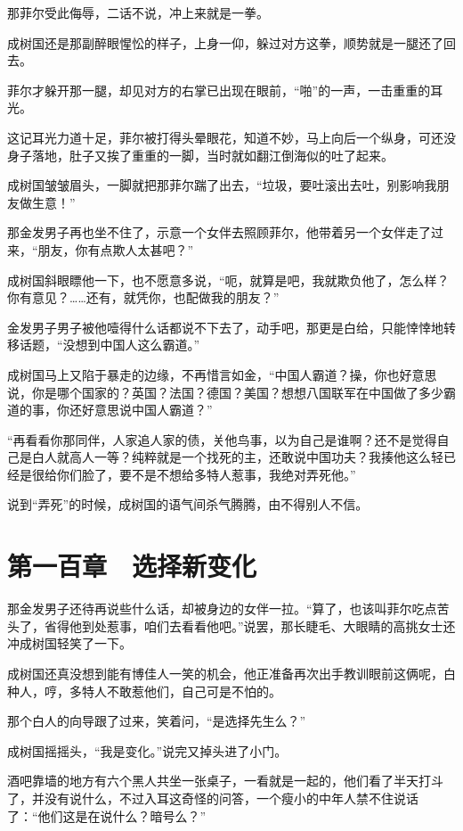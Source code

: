 那菲尔受此侮辱，二话不说，冲上来就是一拳。

成树国还是那副醉眼惺忪的样子，上身一仰，躲过对方这拳，顺势就是一腿还了回去。

菲尔才躲开那一腿，却见对方的右掌已出现在眼前，“啪”的一声，一击重重的耳光。

这记耳光力道十足，菲尔被打得头晕眼花，知道不妙，马上向后一个纵身，可还没身子落地，肚子又挨了重重的一脚，当时就如翻江倒海似的吐了起来。

成树国皱皱眉头，一脚就把那菲尔踹了出去，“垃圾，要吐滚出去吐，别影响我朋友做生意！”

那金发男子再也坐不住了，示意一个女伴去照顾菲尔，他带着另一个女伴走了过来，“朋友，你有点欺人太甚吧？”

成树国斜眼瞟他一下，也不愿意多说，“呃，就算是吧，我就欺负他了，怎么样？你有意见？……还有，就凭你，也配做我的朋友？”

金发男子男子被他噎得什么话都说不下去了，动手吧，那更是白给，只能悻悻地转移话题，“没想到中国人这么霸道。”

成树国马上又陷于暴走的边缘，不再惜言如金，“中国人霸道？操，你也好意思说，你是哪个国家的？英国？法国？德国？美国？想想八国联军在中国做了多少霸道的事，你还好意思说中国人霸道？”

“再看看你那同伴，人家追人家的债，关他鸟事，以为自己是谁啊？还不是觉得自己是白人就高人一等？纯粹就是一个找死的主，还敢说中国功夫？我揍他这么轻已经是很给你们脸了，要不是不想给多特人惹事，我绝对弄死他。”

说到“弄死”的时候，成树国的语气间杀气腾腾，由不得别人不信。

\section{第一百章　选择新变化}

那金发男子还待再说些什么话，却被身边的女伴一拉。“算了，也该叫菲尔吃点苦头了，省得他到处惹事，咱们去看看他吧。”说罢，那长睫毛、大眼睛的高挑女士还冲成树国轻笑了一下。

成树国还真没想到能有博佳人一笑的机会，他正准备再次出手教训眼前这俩呢，白种人，哼，多特人不敢惹他们，自己可是不怕的。

那个白人的向导跟了过来，笑着问，“是选择先生么？”

成树国摇摇头，“我是变化。”说完又掉头进了小门。

酒吧靠墙的地方有六个黑人共坐一张桌子，一看就是一起的，他们看了半天打斗了，并没有说什么，不过入耳这奇怪的问答，一个瘦小的中年人禁不住说话了：“他们这是在说什么？暗号么？”

